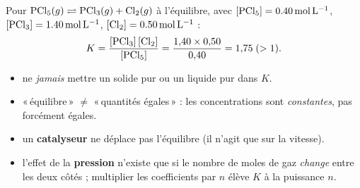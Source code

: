 \documentclass[11pt,a4paper]{article}
\begin{document}
\begin{exemplebox}
Pour $\ce{PCl5}(g) \rightleftharpoons \ce{PCl3}(g) + \ce{Cl2}(g)$ à l'équilibre, avec $[\ce{PCl5}]=\qty{0.40}{\mol\per\litre}$, $[\ce{PCl3}]=\qty{1.40}{\mol\per\litre}$, $[\ce{Cl2}]=\qty{0.50}{\mol\per\litre}$ :
\[ K = \frac{[\ce{PCl3}]\,[\ce{Cl2}]}{[\ce{PCl5}]} = \frac{1{,}40\times 0{,}50}{0{,}40} = 1{,}75\;(>1). \]
\end{exemplebox}

\begin{piege}
\begin{itemize}[leftmargin=1.6em,topsep=2pt,itemsep=1.5pt]
  \item ne \emph{jamais} mettre un solide pur ou un liquide pur dans $K$.
  \item «\,équilibre\,» $\ne$ «\,quantités égales\,» : les concentrations sont \emph{constantes}, pas forcément égales.
  \item un \textbf{catalyseur} ne déplace pas l'équilibre (il n'agit que sur la vitesse).
  \item l'effet de la \textbf{pression} n'existe que si le nombre de moles de gaz \emph{change} entre les deux côtés ; multiplier les coefficients par $n$ élève $K$ à la puissance $n$.
\end{itemize}
\end{piege}
\end{document}
